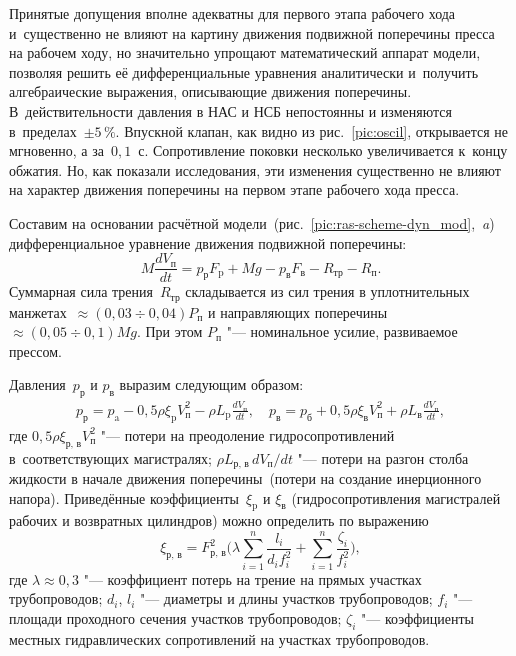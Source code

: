Принятые допущения вполне адекватны для первого этапа рабочего хода и~существенно не влияют на картину движения подвижной поперечины пресса на рабочем ходу, но значительно упрощают математический аппарат модели, позволяя решить её дифференциальные уравнения аналитически и~получить алгебраические выражения, описывающие движения поперечины.
В~действительности давления в НАС и НСБ непостоянны и изменяются в~пределах~$ \pm 5\,\% $. 
Впускной клапан, как видно из рис.~\ref{pic:oscil}, открывается не мгновенно, а за~$ 0,1 $~с. 
Сопротивление поковки несколько увеличивается к~концу обжатия. 
Но, как показали исследования, эти изменения существенно не влияют на характер движения поперечины на первом этапе рабочего хода пресса.

Составим на основании расчётной модели~(рис.~\ref{pic:ras-scheme-dyn_mod},~{\sl a}) дифференциальное уравнение движения подвижной поперечины:
\begin{equation}
     M\frac {d V_\text{п} }{dt}= p_\text{р} F_\text{p}+M g- p_\text{в} F_\text{в}-R_\text{тр}-R_\text{п}.
\label{equ:work-hod-du}
\end{equation}
Суммарная сила трения~$ R_\text{тр} $ складывается из сил трения в уплотнительных манжетах~$\approx(0,03\div0,04)P_\text{п} $ и
направляющих поперечины~$\approx(0,05\div 0,1)M g $. 
При этом $ P_\text{п} $ "--- номинальное усилие, развиваемое прессом.

Давления~$  p_\text{р} $ и $  p_\text{в} $ выразим следующим образом:
\begin{gather}
     p_\text{р}= p_\text{a}-0,5 \rho \xi_\text{p} V^{2}_\text{п}-     \rho  L_\text{p} \frac {d V_\text{п} }{dt},
\label{equ:work-hod-pp}
\quad
     p_\text{в}= p_\text{б}+0,5 \rho \xi_\text{в} V^{2}_\text{п}+     \rho  L_\text{в} \frac {d V_\text{п} }{dt},
\end{gather}
где $ 0,5 \rho \xi_\text{р, в} V^{2}_\text{п} $ "--- потери на преодоление гидросопротивлений в~соответствующих магистралях;
$ \rho L_\text{р, в} \, d V_\text{п} /dt$ "--- потери на разгон столба жидкости в начале движения поперечины~(потери на создание инерционного напора).
Приведённые коэффициенты~$ \xi_\text{p} $ и $ \xi_\text{в} $ (гидросопротивления магистралей рабочих и возвратных цилиндров) можно определить по выражению
\begin{equation}
    \xi_\text{р, в}=F^{2}_\text{р, в}\biggl( \lambda \sum_{i=1}^n\dfrac{l_{i}}{d_{i} f^{2}_{i}} +\sum_{i=1}^n\dfrac{\zeta_{i}}{f^{2}_{i}}\biggr),
\label{equ:work-hod-xi-p-b}
\end{equation}
где $ \lambda \approx 0,3$ "---  коэффициент потерь на трение на прямых участках трубопроводов;
$ d_{i} $, $ l_{i} $ "---  диаметры и длины участков трубопроводов;
$ f_{i} $ "---  площади проходного сечения участков трубопроводов;
$ \zeta_{i} $ "---  коэффициенты местных гидравлических сопротивлений на участках трубопроводов.

